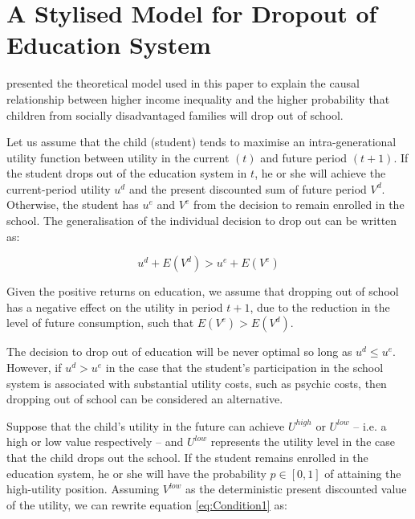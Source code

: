 \documentclass[a4paper, 12pt]{article}
\begin{document}





\newpage
\section{A Stylised Model for Dropout of Education System}
\label{appendix:kearneyLevine}


\citet{kearney2014income} presented the theoretical model used in this paper to explain the causal relationship between higher income inequality and the higher probability that children from socially disadvantaged families will drop out of school.

Let us assume that the child (student) tends to maximise an intra-generational utility function between utility in the current $(t)$ and future period $(t+1)$. If the student drops out of the education system in $t$, he or she will achieve the current-period utility $u^d$ and the present discounted sum of future period $V^d$. Otherwise, the student has $u^e$ and $V^e$ from the decision to remain enrolled in the school. The generalisation of the individual decision to drop out can be written as: 



\begin{equation} \label{eq:Condition1} 
u^d + E(V^d)>u^e + E(V^e)
\end{equation}

Given the positive returns on education, we assume that dropping out of school has a negative effect on the utility in period $t+1$, due to the reduction in the level of future consumption, such that $E(V^e)>E(V^d)$. 

The decision to drop out of education will be never optimal so long as $u^d \leq u^e$. However, if $u^d > u^e$ in the case that the student's participation in the school system is associated with substantial utility costs, such as psychic costs, then dropping out of school can be considered an alternative. 

Suppose that the child's utility in the future can achieve $U^{high}$ or $U^{low}$ – i.e. a high or low value respectively – and $U^{low}$ represents the utility level in the case that the child drops out the school. If the student remains enrolled in the education system, he or she will have the probability $p \in [0,1]$ of attaining the high-utility position. Assuming $V^{low}$ as the deterministic present discounted value of the utility, we can rewrite equation \eqref{eq:Condition1} as:
\end{document}
